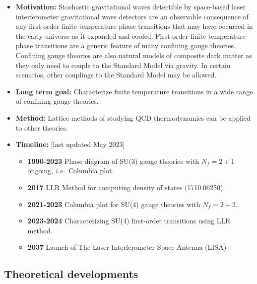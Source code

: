 \documentclass[12pt,hyperpdf]{article}
\begin{document}
\begin{itemize}
   \item { \bf Motivation:} Stochastic gravitational waves detectible by space-based laser interferometer gravitational wave detectors are an observable consequence of any first-order finite temperature phase transitions that may have occurred in the early universe as it expanded and cooled.  First-order finite temperature phase transitions are a generic feature of many confining gauge theories.  Confining gauge theories are also natural models of composite dark matter as they only need to couple to the Standard Model via gravity.  In certain scenarios, other couplings to the Standard Model may be allowed.
   \item { \bf Long term goal:}  Characterize finite temperature transitions in a wide range of confining gauge theories.
   \item {\bf Method:} Lattice methods of studying QCD thermodynamics can be applied to other theories.
\item{\bf Timeline:} \hfill [last updated May 2023]
\begin{itemize}
   \item { \bf 1990-2023} Phase diagram of SU(3) gauge theories with $N_f=2+1$ ongoing, \textit{i.e.}\ Columbia plot.
   \item{ \bf 2017} LLR Method for computing density of states (1710.06250).
   \item{ \bf 2021-2023} Columbia plot for SU(4) gauge theories with $N_f=2+2$. 
   \item{ \bf 2023-2024} Characterizing SU(4) first-order transitions using LLR method. 
   \item{ \bf 2037} Launch of The Laser Interferometer Space Antenna (LISA)
\end{itemize}
\end{itemize}


\subsection{Theoretical developments}

\end{document}
